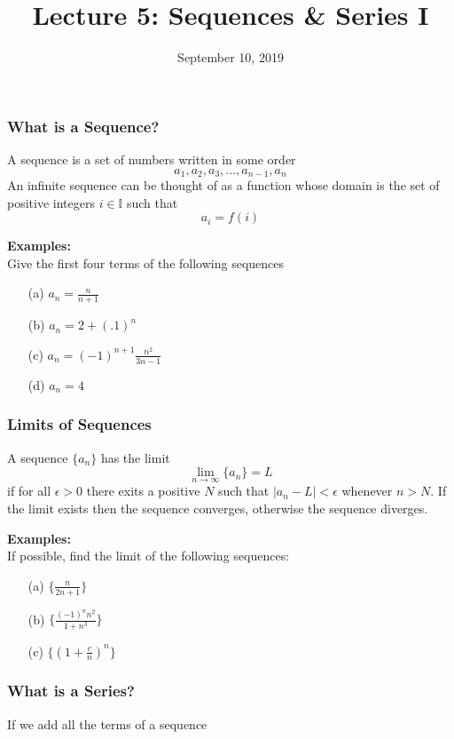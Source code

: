 \documentclass{beamer}
\title{Lecture 5: Sequences \& Series I}
\date{September 10, 2019}
\begin{document}
	
\frame{\titlepage}

\begin{frame}
\frametitle{What is a Sequence?}
A sequence is a set of numbers written in some order
$$a_1, a_2, a_3,...,a_{n-1}, a_n$$
An infinite sequence can be thought of as a function whose domain is the set of positive integers $i \in \mathbb{I}$ such that
$$a_i = f(i)$$

\vspace{6pt}
\textbf{Examples:}\\
Give the first four terms of the following sequences
\begin{itemize}
	\item[(a)] $a_n = \frac{n}{n+1}$
	\item[(b)] $a_n = 2 + (.1)^n$
	\item[(c)] $a_n = (-1)^{n+1} \frac{n^2}{3n-1}$
	\item[(d)] $a_n = 4$
\end{itemize}
\end{frame}

\begin{frame}
\frametitle{Limits of Sequences}
A sequence $\{a_n\}$ has the limit
$$\lim\limits_{n \to \infty} \{a_n\} = L$$
if for all $\epsilon > 0$ there exits a positive $N$ such that $|a_n-L| < \epsilon$ whenever $n>N$. If the limit exists then the sequence converges, otherwise the sequence diverges.

\vspace{6pt}
\textbf{Examples:}\\
If possible, find the limit of the following sequences:
\begin{itemize}
	\item[(a)] $\{\frac{n}{2n+1}\}$
	\item[(b)] $\{ \frac{(-1)^nn^2}{1+n^3}\}$
	\item[(c)] $\{(1+\frac{c}{n})^n\}$
\end{itemize}
\end{frame}

\begin{frame}
\frametitle{What is a Series?}
If we add all the terms of a sequence
\end{frame}
\end{document}
